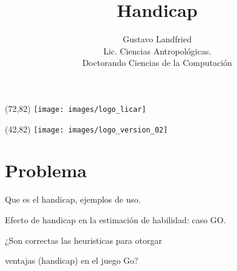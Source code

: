 \documentclass[shownotes]{beamer}
\title[Handicap]{Handicap}
\author[Gustavo Landfried]{Gustavo Landfried \\ \vspace{0.2cm}
\scriptsize Lic. Ciencias Antropol\'ogicas. \\
Doctorando Ciencias de la Computaci\'on \\
\vspace{-0.3cm}}
\institute[DC-ICC-CONICET]{Departamento de Ciencias de la Computaci\'on (UBA -- CONICET) \vspace{-0.3cm}}
\date{}
\begin{document}
\small 

\begin{frame}[noframenumbering]

\maketitle

 \begin{textblock}{80}(72,82)
 \texttt{[image: images/logo\_licar]} 
 \end{textblock}
  \begin{textblock}{80}(42,82)
 \texttt{[image: images/logo\_version\_02]} 
\end{textblock}

\end{frame}

\section{Problema}

\begin{frame}
  Que es el handicap, ejemplos de uso.
\end{frame}


\begin{frame}
 
 \begin{framed} \centering
  Efecto de handicap en la estimaci\'on de habilidad: caso GO.
 \end{framed}
 
\end{frame}

\begin{frame}
 \begin{framed} \centering
  ¿Son correctas las heuristicas para otorgar 
  
  ventajas (handicap) en el juego Go?
 \end{framed}
 
\end{frame}
\end{document}
